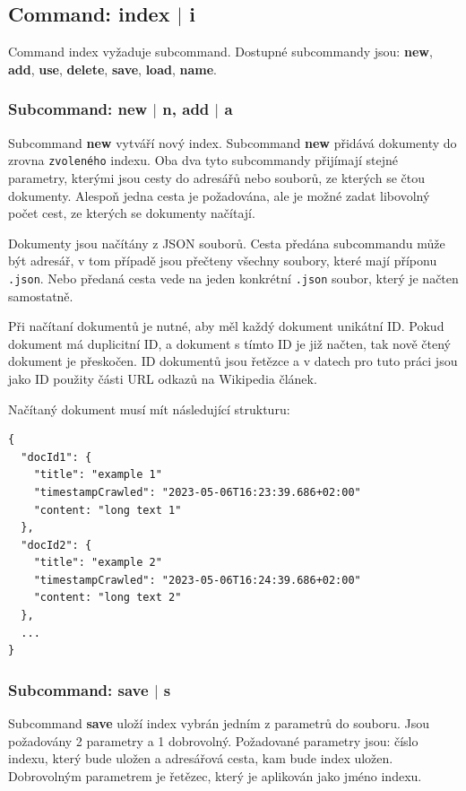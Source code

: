 \documentclass[12pt, letterpaper]{article}
\begin{document}
\subsection{Command: index $|$ i}
Command index vyžaduje subcommand. Dostupné subcommandy jsou: \textbf{new}, \textbf{add}, \textbf{use}, \textbf{delete},
\textbf{save}, \textbf{load}, \textbf{name}.
%
\subsubsection{Subcommand: new $|$ n, add $|$ a}
Subcommand \textbf{new} vytváří nový index. Subcommand \textbf{new} přidává dokumenty do zrovna \texttt{zvoleného}
indexu. Oba dva tyto subcommandy přijímají stejné parametry, kterými jsou cesty do adresářů nebo souborů, ze kterých
se čtou dokumenty. Alespoň jedna cesta je požadována, ale je možné zadat libovolný počet cest, ze kterých se dokumenty
načítají.

Dokumenty jsou načítány z JSON souborů. Cesta předána subcommandu může být adresář, v tom případě jsou přečteny všechny
soubory, které mají příponu \texttt{.json}. Nebo předaná cesta vede na jeden konkrétní \texttt{.json} soubor, který
je načten samostatně.

Při načítaní dokumentů je nutné, aby měl každý dokument unikátní ID. Pokud dokument má duplicitní ID, a dokument s tímto
ID je již načten, tak nově čtený dokument je přeskočen. ID dokumentů jsou řetězce a v datech pro tuto práci jsou jako ID
použity části URL odkazů na Wikipedia článek.

Načítaný dokument musí mít následující strukturu:
\begin{lstlisting}[caption=Struktura JSON souboru s indexovatelnými dokumenty, captionpos=b]
{
  "docId1": {
    "title": "example 1"
    "timestampCrawled": "2023-05-06T16:23:39.686+02:00"
    "content: "long text 1"
  },
  "docId2": {
    "title": "example 2"
    "timestampCrawled": "2023-05-06T16:24:39.686+02:00"
    "content: "long text 2"
  },
  ...
}
\end{lstlisting}
%
\subsubsection{Subcommand: save $|$ s}
Subcommand \textbf{save} uloží index vybrán jedním z parametrů do souboru. Jsou požadovány 2 parametry a 1 dobrovolný.
Požadované parametry jsou: číslo indexu, který bude uložen a adresářová cesta, kam bude index uložen. Dobrovolným
parametrem je řetězec, který je aplikován jako jméno indexu.
\end{document}
